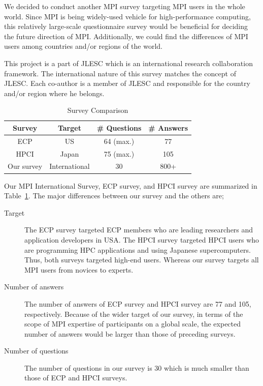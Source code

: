 \documentclass[submit,techrep,noauthor,english]{ipsj}
\begin{document}
We decided to conduct another MPI survey targeting MPI users in the
whole world. Since MPI is being widely-used vehicle for
high-performance computing, this relatively large-scale questionnaire 
survey would be beneficial for deciding the future direction of MPI.  
Additionally, we could find the differences of MPI users among
countries and/or regions of the world.  

This project is a part of  JLESC\cite{JLESC} which is an
international research collaboration framework. The international
nature of this survey matches the concept of JLESC. Each co-author is
a member of JLESC and responsible for the country and/or
region where he belongs. 

\begin{table}[htb]%
\begin{center}%
\caption{Survey Comparison}\label{tab:comparison}%
\begin{tabular}{c|ccc}%
\hline%
Survey & Target & \# Questions & \# Answers \\%
\hline%
ECP  & US & 64 (max.) & 77 \\
HPCI & Japan & 75 (max.) & 105 \\
\hline
Our survey & International & 30 & 800+ \\
\hline%
\end{tabular}%
\end{center}%
\end{table}%

Our MPI International Survey, ECP survey, and HPCI survey are
summarized in Table~\ref{tab:comparison}. The major differences
between our survey and the others are;

\begin{description}
\item[Target]
  The ECP survey targeted ECP members who are leading researchers and
  application developers in USA. The HPCI survey targeted HPCI users
  who are programming HPC applications and using Japanese
  supercomputers. Thus, both surveys targeted high-end users. Whereas
  our survey targets all MPI users from novices to experts.
\item[Number of answers]
  The number of answers of ECP survey and HPCI survey are 77 and 105,
  respectively. Because of the wider target of our survey, in terms of
  the scope of MPI expertise of participants on a global scale, the
  expected number of answers would be larger than those of preceding
  surveys. 
\item[Number of questions]
  The number of questions in our survey is 30 which is much
  smaller than those of ECP and HPCI surveys. 
\end{description}
\end{document}
